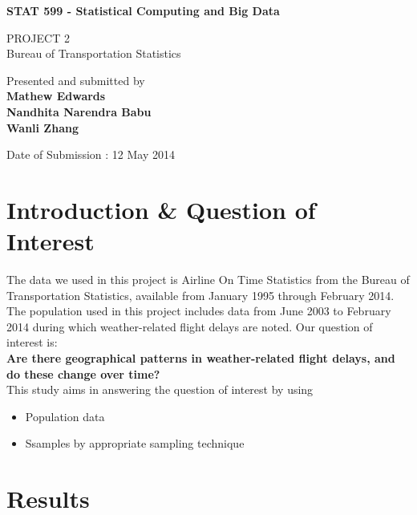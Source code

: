 \documentclass{article}
\begin{document}
\begin{titlepage}
    \begin{center}
        \vspace*{1cm}
        
        \Huge
        \textbf{STAT 599 - Statistical Computing and Big Data}
        
        \vspace{1cm}
        \LARGE
        PROJECT 2\\
        Bureau of Transportation Statistics
        
        \vspace{8cm}
        Presented and submitted by \\
        \textbf{Mathew Edwards} \\
        \textbf{Nandhita Narendra Babu} \\
        \textbf{Wanli Zhang}
        
        \vspace{0.5cm}
        Date of Submission : 12 May 2014
        
       
        
    \end{center}
\end{titlepage}



\section{Introduction \& Question of Interest}
The data we used in this project is Airline On Time Statistics from the Bureau of Transportation Statistics, available from January 1995 through February 2014. The population used in this project includes data from June 2003 to February 2014 during which weather-related flight delays are noted. Our question of interest is:\\
\textbf{Are there geographical patterns in weather-related flight delays, and do these change over time?}\\
This study aims in answering the question of interest by using
\begin{itemize}
\item Population data
\item Ssamples by appropriate sampling technique
\end{itemize}

\section{Results}
\end{document}
